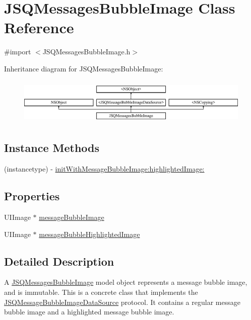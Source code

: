 \hypertarget{interface_j_s_q_messages_bubble_image}{}\section{J\+S\+Q\+Messages\+Bubble\+Image Class Reference}
\label{interface_j_s_q_messages_bubble_image}


{\ttfamily \#import $<$J\+S\+Q\+Messages\+Bubble\+Image.\+h$>$}

Inheritance diagram for J\+S\+Q\+Messages\+Bubble\+Image\+:\begin{figure}[H]
\begin{center}
\leavevmode
\includegraphics[height=2.248996cm]{interface_j_s_q_messages_bubble_image}
\end{center}
\end{figure}
\subsection*{Instance Methods}
\begin{DoxyCompactItemize}
\item 
(instancetype) -\/ \hyperlink{interface_j_s_q_messages_bubble_image_a950b5a5ed124b584faecd17d352f94c9}{init\+With\+Message\+Bubble\+Image\+:highlighted\+Image\+:}
\end{DoxyCompactItemize}
\subsection*{Properties}
\begin{DoxyCompactItemize}
\item 
U\+I\+Image $\ast$ \hyperlink{interface_j_s_q_messages_bubble_image_a6780a193bff2e635e1e224832bd7178a}{message\+Bubble\+Image}
\item 
U\+I\+Image $\ast$ \hyperlink{interface_j_s_q_messages_bubble_image_acf8df32f421b6e308e528f0bdab65617}{message\+Bubble\+Highlighted\+Image}
\end{DoxyCompactItemize}


\subsection{Detailed Description}
A {\ttfamily \hyperlink{interface_j_s_q_messages_bubble_image}{J\+S\+Q\+Messages\+Bubble\+Image}} model object represents a message bubble image, and is immutable. This is a concrete class that implements the {\ttfamily \hyperlink{protocol_j_s_q_message_bubble_image_data_source-p}{J\+S\+Q\+Message\+Bubble\+Image\+Data\+Source}} protocol. It contains a regular message bubble image and a highlighted message bubble image.

